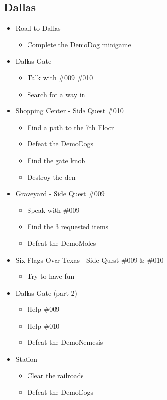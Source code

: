\subsection{Dallas}
\begin{itemize}
	\item Road to Dallas
	\begin{itemize}	
		\item Complete the DemoDog minigame
	\end{itemize}
	\item Dallas Gate
	\begin{itemize}
		\item Talk with \#009 \#010
		\item Search for a way in
	\end{itemize}
	\item Shopping Center - Side Quest \#010
	\begin{itemize}
		\item Find a path to the 7th Floor
		\item Defeat the DemoDogs
		\item Find the gate knob
		\item Destroy the den
	\end{itemize}
	\item Graveyard - Side Quest \#009
	\begin{itemize}
		\item Speak with \#009
		\item Find the 3 requested items
		\item Defeat the DemoMoles
	\end{itemize}
	\item Six Flags Over Texas - Side Quest \#009 \& \#010
	\begin{itemize}
		\item Try to have fun
	\end{itemize}
	\item Dallas Gate (part 2)
	\begin{itemize}
		\item Help \#009
		\item Help \#010
		\item Defeat the DemoNemesis
	\end{itemize}
	\item Station
	\begin{itemize}
		\item Clear the railroads
		\item Defeat the DemoDogs
	\end{itemize}
\end{itemize}

